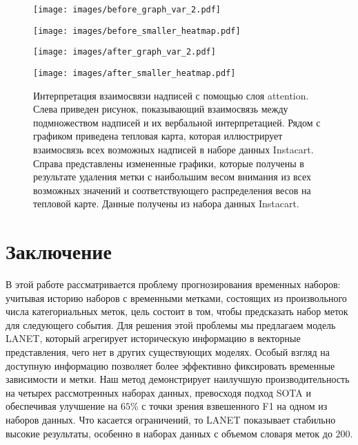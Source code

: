 \documentclass[a4paper, 12pt]{article} %
\begin{document}
\begin{figure*}
\centering
\begin{minipage}{.22\textwidth}
\centering
\texttt{[image: images/before\_graph\_var\_2.pdf]} 
\label{fig:test1}
\end{minipage}
\begin{minipage}{.22\textwidth}
\centering
\texttt{[image: images/before\_smaller\_heatmap.pdf]} 
\label{fig:test2}
\end{minipage}%
\begin{minipage}{.22\textwidth}
\centering
\texttt{[image: images/after\_graph\_var\_2.pdf]} 
\label{fig:test3}
\end{minipage}
\begin{minipage}{.22\textwidth}
\centering
\texttt{[image: images/after\_smaller\_heatmap.pdf]} 
\label{fig:test4}
\end{minipage}\caption{Интерпретация взаимосвязи надписей с помощью слоя attention. Слева приведен рисунок, показывающий взаимосвязь между подмножеством надписей и их вербальной интерпретацией. Рядом с графиком приведена тепловая карта, которая иллюстрирует взаимосвязь всех возможных надписей в наборе данных Instacart. Справа представлены измененные графики, которые получены в результате удаления метки с наибольшим весом внимания из всех возможных значений и соответствующего распределения весов на тепловой карте. Данные получены из набора данных Instacart.}
\vspace{10pt}
\label{fig:ablation2}
\end{figure*}

\section{Заключение}
В этой работе рассматривается проблему прогнозирования временных наборов: учитывая историю наборов с временными метками, состоящих из произвольного числа категориальных меток, цель состоит в том, чтобы предсказать набор меток для следующего события. Для решения этой проблемы мы предлагаем модель LANET, который агрегирует историческую информацию в векторные представления, чего нет в других существующих моделях. Особый взгляд на доступную информацию позволяет более эффективно фиксировать временные зависимости и метки. Наш метод демонстрирует наилучшую производительность на четырех рассмотренных наборах данных, превосходя подход SOTA и обеспечивая улучшение на $65\%$ с точки зрения взвешенного F1 на одном из наборов данных. Что касается ограничений, то LANET показывает стабильно высокие результаты, особенно в наборах данных с объемом словаря меток до $200$.
 

 
\end{document}
